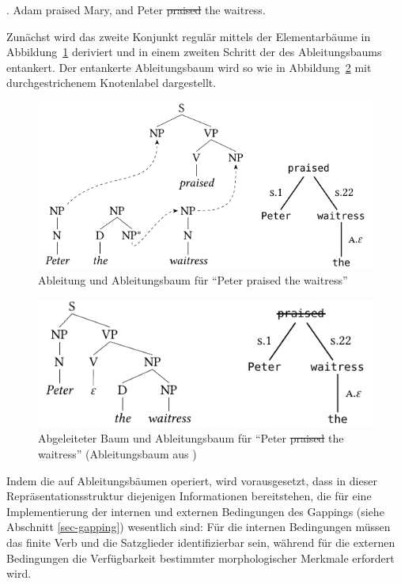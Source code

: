 \ex. \label{ex-deanchoring-1} Adam praised Mary, and Peter \sout{praised} the waitress.   
  
Zunächst wird das zweite Konjunkt regulär mittels der Elementarbäume in Abbildung~\ref{fig-deanchoring-1} deriviert und in einem zweiten Schritt der  des Ableitungsbaums entankert. Der entankerte Ableitungsbaum wird so wie in Abbildung~\ref{fig-deanchoring-2} mit durchgestrichenem Knotenlabel dargestellt. 

\begin{figure}[t]
\centering
\includegraphics{graphics/abb814.pdf}
\caption{\label{fig-deanchoring-1}Ableitung und Ableitungsbaum für "`Peter praised the waitress"' \citep[Abbildung~4]{Lichte:Kallmeyer:10}}
\end{figure}
 

\begin{figure}[t]
\centering
\includegraphics{graphics/abb815.pdf}
\caption{\label{fig-deanchoring-2}Abgeleiteter Baum und Ableitungsbaum für "`Peter \sout{praised} the waitress"' (Ableitungsbaum aus \citealt[Abbildung~2]{Lichte:Kallmeyer:10})}
\end{figure}

Indem die  auf Ableitungsbäumen operiert, wird vorausgesetzt, dass in dieser Repräsentationsstruktur diejenigen Informationen bereitstehen, die für eine Implementierung der internen und externen Bedingungen des Gappings (siehe Abschnitt \ref{sec-gapping}) wesentlich sind: Für die internen Bedingungen müssen das finite Verb und die Satzglieder identifizierbar sein, während für die externen Bedingungen die Verfügbarkeit bestimmter morphologischer Merkmale erfordert wird.

